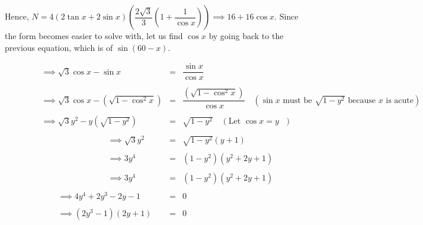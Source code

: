 \documentclass[11pt,paper=letter]{scrartcl}
\begin{document}
Hence, $N = 4(2\tan x + 2\sin x)\left(\dfrac{2\sqrt{3}}{3} \left(1 + \dfrac{1}{\cos x}\right)\right) \implies 16 + 16\cos x$. Since the form becomes easier to solve with, let us find $\cos x$ by going back to the previous equation, which is of $\sin (60-x).$

\begin{equation*}
        \begin{array}{lll}
      
            
          \qquad \qquad   \implies \sqrt{3}\cos x - \sin x & = & \dfrac{\sin x}{\cos x} \\
           
           \\
           
           \qquad \qquad  \implies \sqrt{3}\cos x - \left(\sqrt{1-\cos^2 x}\right) & = & \dfrac{\left(\sqrt{1-\cos^2 x}\right)}{\cos x} \quad (\text{$\sin x$ must be $\sqrt{1-y^2}$ because $x$ is acute}) \\
           
           \\
           
           
            \qquad \qquad   \implies \sqrt{3}y^2 - y\left(\sqrt{1-y^2 }\right) & = & \sqrt{1-y^2} \quad (\text{Let $\cos x = y$ }) \\
             
             \\
             
               \qquad \qquad  \qquad \qquad \qquad \qquad \implies \sqrt{3}y^2 & = & \sqrt{1-y^2} (y+1)  \\
              
              \\
              
                \qquad \qquad \qquad \qquad \qquad \qquad  \implies 3y^4 & = & (1-y^2) (y^2 + 2y +1)  \\
              
              \\
              
                 \qquad \qquad \qquad \qquad \qquad \qquad \implies 3y^4 & = & (1-y^2) (y^2 + 2y +1)  \\
                 
                 \\
                 
              \qquad \qquad \qquad \implies 4y^4 + 2y^3 - 2y -1 & = & 0  \\
              
              \\
              
               \qquad \qquad \qquad \implies (2y^3 -1)(2y+1) & = & 0  \\
        \end{array}
    \end{equation*}
    
\end{document}
